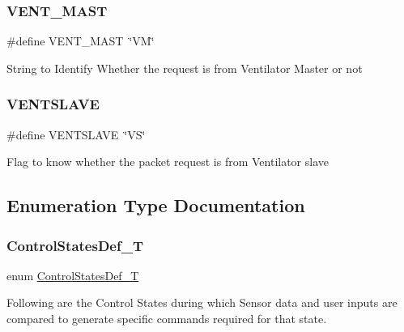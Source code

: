 \subsubsection{\texorpdfstring{V\+E\+N\+T\+\_\+\+M\+A\+ST}{VENT\_MAST}}
{\footnotesize\ttfamily \#define V\+E\+N\+T\+\_\+\+M\+A\+ST~\char`\"{}VM\char`\"{}}

String to Identify Whether the request is from Ventilator Master or not \mbox{\label{group___state_control_module_ga094c380bc7b252c380fe99f9f1f3a40c}} 
\subsubsection{\texorpdfstring{V\+E\+N\+T\+S\+L\+A\+VE}{VENTSLAVE}}
{\footnotesize\ttfamily \#define V\+E\+N\+T\+S\+L\+A\+VE~\char`\"{}VS\char`\"{}}

Flag to know whether the packet request is from Ventilator slave 

\subsection{Enumeration Type Documentation}
\mbox{\label{group___state_control_module_gac6eef437321073e19b469605f47262f5}} 
\subsubsection{\texorpdfstring{Control\+States\+Def\+\_\+T}{ControlStatesDef\_T}}
{\footnotesize\ttfamily enum \hyperlink{group___state_control_module_gac6eef437321073e19b469605f47262f5}{Control\+States\+Def\+\_\+T}}



Following are the Control States during which Sensor data and user inputs are compared to generate specific commands required for that state. 

